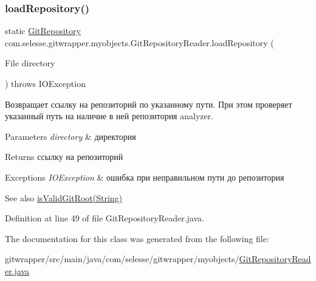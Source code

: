 \subsubsection{\texorpdfstring{load\+Repository()}{loadRepository()}}
{\footnotesize\ttfamily static \hyperlink{classcom_1_1selesse_1_1gitwrapper_1_1myobjects_1_1_git_repository}{Git\+Repository} com.\+selesse.\+gitwrapper.\+myobjects.\+Git\+Repository\+Reader.\+load\+Repository (\begin{DoxyParamCaption}\item[{File}]{directory }\end{DoxyParamCaption}) throws I\+O\+Exception\hspace{0.3cm}{\ttfamily [static]}}

Возвращает ссылку на репозиторий по указанному пути. При этом проверяет указанный путь на наличие в ней репозитория analyzer.


\begin{DoxyParams}{Parameters}
{\em directory} & директория \\
\hline
\end{DoxyParams}
\begin{DoxyReturn}{Returns}
ссылку на репозиторий 
\end{DoxyReturn}

\begin{DoxyExceptions}{Exceptions}
{\em I\+O\+Exception} & ошибка при неправильном пути до репозитория \\
\hline
\end{DoxyExceptions}
\begin{DoxySeeAlso}{See also}
\hyperlink{classcom_1_1selesse_1_1gitwrapper_1_1myobjects_1_1_git_repository_reader_a734f08d9550fd1add83ab661ca390f3a}{is\+Valid\+Git\+Root(\+String)} 
\end{DoxySeeAlso}


Definition at line 49 of file Git\+Repository\+Reader.\+java.



The documentation for this class was generated from the following file\+:\begin{DoxyCompactItemize}
\item 
gitwrapper/src/main/java/com/selesse/gitwrapper/myobjects/\hyperlink{_git_repository_reader_8java}{Git\+Repository\+Reader.\+java}\end{DoxyCompactItemize}
